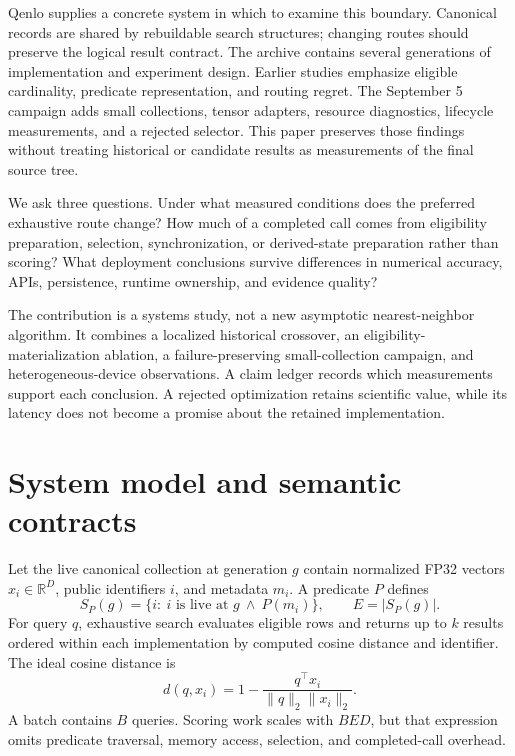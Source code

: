 \documentclass[10pt]{article}
\begin{document}
Qenlo supplies a concrete system in which to examine this boundary. Canonical records are shared by rebuildable search structures; changing routes should preserve the logical result contract. The archive contains several generations of implementation and experiment design. Earlier studies emphasize eligible cardinality, predicate representation, and routing regret. The September 5 campaign adds small collections, tensor adapters, resource diagnostics, lifecycle measurements, and a rejected selector. This paper preserves those findings without treating historical or candidate results as measurements of the final source tree.

We ask three questions. Under what measured conditions does the preferred exhaustive route change? How much of a completed call comes from eligibility preparation, selection, synchronization, or derived-state preparation rather than scoring? What deployment conclusions survive differences in numerical accuracy, APIs, persistence, runtime ownership, and evidence quality?

The contribution is a systems study, not a new asymptotic nearest-neighbor algorithm. It combines a localized historical crossover, an eligibility-materialization ablation, a failure-preserving small-collection campaign, and heterogeneous-device observations. A claim ledger records which measurements support each conclusion. A rejected optimization retains scientific value, while its latency does not become a promise about the retained implementation.

\section{System model and semantic contracts}
Let the live canonical collection at generation $g$ contain normalized FP32 vectors $x_i\in\mathbb{R}^D$, public identifiers $i$, and metadata $m_i$. A predicate $P$ defines
\begin{equation}
 S_P(g)=\{i:\ i\text{ is live at }g\ \land\ P(m_i)\},\qquad E=|S_P(g)|.
\end{equation}
For query $q$, exhaustive search evaluates eligible rows and returns up to $k$ results ordered within each implementation by computed cosine distance and identifier. The ideal cosine distance is
\begin{equation}
 d(q,x_i)=1-\frac{q^\top x_i}{\|q\|_2\|x_i\|_2}.
\end{equation}
A batch contains $B$ queries. Scoring work scales with $BED$, but that expression omits predicate traversal, memory access, selection, and completed-call overhead.
\end{document}
